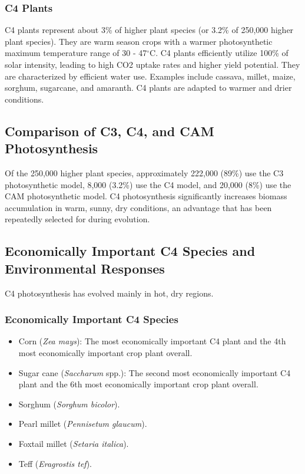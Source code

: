 \subsubsection*{C4 Plants} 
C4 plants represent about 3\% of higher plant species (or 3.2\% of 250,000 higher plant species). They are warm season crops with a warmer photosynthetic maximum temperature range of 30 - 47$^{\circ}$C. C4 plants efficiently utilize 100\% of solar intensity, leading to high CO2 uptake rates and higher yield potential. They are characterized by efficient water use. Examples include cassava, millet, maize, sorghum, sugarcane, and amaranth. C4 plants are adapted to warmer and drier conditions.

\subsection{Comparison of C3, C4, and CAM Photosynthesis} 
Of the 250,000 higher plant species, approximately 222,000 (89\%) use the C3 photosynthetic model, 8,000 (3.2\%) use the C4 model, and 20,000 (8\%) use the CAM photosynthetic model. C4 photosynthesis significantly increases biomass accumulation in warm, sunny, dry conditions, an advantage that has been repeatedly selected for during evolution.

\subsection{Economically Important C4 Species and Environmental Responses} C4 photosynthesis has evolved mainly in hot, dry regions.

\subsubsection*{Economically Important C4 Species} 
\begin{itemize} 
    \item Corn (\textit{Zea mays}): The most economically important C4 plant and the 4th most economically important crop plant overall. 
    \item Sugar cane (\textit{Saccharum} spp.): The second most economically important C4 plant and the 6th most economically important crop plant overall. 
    \item Sorghum (\textit{Sorghum bicolor}). 
    \item Pearl millet (\textit{Pennisetum glaucum}). 
    \item Foxtail millet (\textit{Setaria italica}). 
    \item Teff (\textit{Eragrostis tef}). 
\end{itemize}

